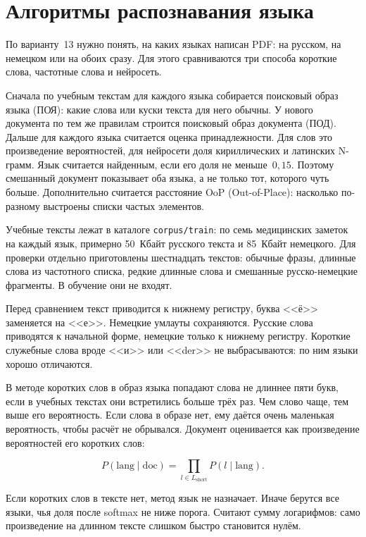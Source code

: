 \section{Алгоритмы распознавания языка}
\label{sec:algorithms}

По варианту~13 нужно понять, на каких языках написан PDF: на русском, на немецком или на обоих сразу. Для этого сравниваются три способа \mdash короткие слова, частотные слова и нейросеть.

Сначала по учебным текстам для каждого языка собирается поисковый образ языка (ПОЯ): какие слова или куски текста для него обычны. У нового документа по тем же правилам строится поисковый образ документа (ПОД). Дальше для каждого языка считается оценка принадлежности. Для слов это произведение вероятностей, для нейросети \mdash доля кириллических и латинских N-грамм. Язык считается найденным, если его доля не меньше~$0{,}15$. Поэтому смешанный документ показывает оба языка, а не только тот, которого чуть больше. Дополнительно считается расстояние OoP (Out-of-Place): насколько по-разному выстроены списки частых элементов.

Учебные тексты лежат в каталоге \texttt{corpus/train}: по семь медицинских заметок на каждый язык, примерно 50~Кбайт русского текста и 85~Кбайт немецкого. Для проверки отдельно приготовлены шестнадцать текстов: обычные фразы, длинные слова из частотного списка, редкие длинные слова и смешанные русско-немецкие фрагменты. В обучение они не входят.

Перед сравнением текст приводится к нижнему регистру, буква <<ё>> заменяется на <<е>>. Немецкие умлауты сохраняются. Русские слова приводятся к начальной форме, немецкие только к нижнему регистру. Короткие служебные слова вроде <<и>> или <<der>> не выбрасываются: по ним языки хорошо отличаются.

В методе коротких слов в образ языка попадают слова не длиннее пяти букв, если в учебных текстах они встретились больше трёх раз. Чем слово чаще, тем выше его вероятность. Если слова в образе нет, ему даётся очень маленькая вероятность, чтобы расчёт не обрывался. Документ оценивается как произведение вероятностей его коротких слов:

\begin{equation}
	P(\mathrm{lang}\mid\mathrm{doc}) = \prod_{l \in L_{\mathrm{short}}} P(l\mid\mathrm{lang}).
	\label{eq:short}
\end{equation}

Если коротких слов в тексте нет, метод язык не назначает. Иначе берутся все языки, чья доля после softmax не ниже порога. Считают сумму логарифмов: само произведение на длинном тексте слишком быстро становится нулём.

